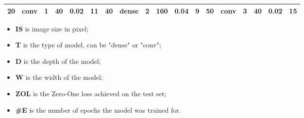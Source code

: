 \begin{table}[t!]
{\begin{tabular}{@{}llllll|llllll|llllll@{}}
20                              & conv                           & 1                              & 40                             & 0.02                             & 11                                & 40                              & dense                          & 2                              & 160                            & 0.04                           & 9                                 & 50                              & conv                           & 3                              & 40                             & 0.02                           & 15                               \\ \bottomrule
\end{tabular}}
\begin{itemize}
    \setlength\itemsep{0pt}
    \item[] \textbf{IS} is image size in pixel;
    \item[] \textbf{T} is the type of model, can be "dense" or "conv";
    \item[] \textbf{D} is the depth of the model;
    \item[] \textbf{W} is the width of the model;
    \item[] \textbf{ZOL} is the Zero-One loss achieved on the test set;
    \item[] \textbf{\#E} is the number of epochs the model was trained for.
\end{itemize}
\end{table}

